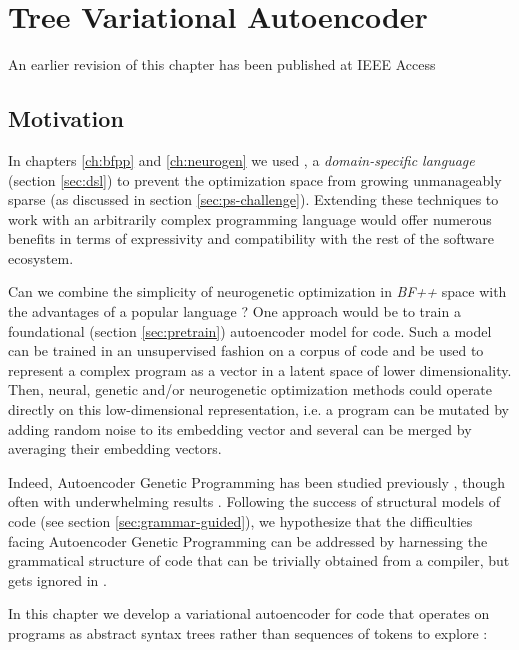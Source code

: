 \chapter{Tree Variational Autoencoder}\label{ch:tree2tree}
\begin{remark}
    An earlier revision of this chapter \cite{liventsevTreeVariationalAutoencoder2025} has been published at IEEE Access
\end{remark}

\section{Motivation}

In chapters \ref{ch:bfpp} and \ref{ch:neurogen} we used , a \emph{domain-specific language} (section \ref{sec:dsl}) to prevent the optimization space from growing unmanageably sparse (as discussed in section \ref{sec:ps-challenge}).
Extending these techniques to work with an arbitrarily complex programming language would offer numerous benefits in terms of expressivity and compatibility with the rest of the software ecosystem.

Can we combine the simplicity of neurogenetic optimization in \emph{BF++} space with the advantages of a popular language \cite{tiobe2017tiobe}?
One approach would be to train a foundational (section \ref{sec:pretrain}) autoencoder \cite{autoencoders} model for code.
Such a model can be trained in an unsupervised fashion on a corpus of code and be used to represent a complex program as a vector in a latent space of lower dimensionality.
Then, neural, genetic and/or neurogenetic optimization methods could operate directly on this low-dimensional representation, i.e. a program can be mutated by adding random noise to its embedding vector and several can be merged by averaging their embedding vectors.

Indeed, Autoencoder Genetic Programming has been studied previously \cite{wittenbergDenoisingAutoencoderGenetic2023,latentspaceopt}, though often with underwhelming results \cite{autoenc-gp}.
Following the success of structural models of code (see section \ref{sec:grammar-guided}), we hypothesize that the difficulties facing Autoencoder Genetic Programming can be addressed by harnessing the grammatical structure of code that can be trivially obtained from a compiler, but gets ignored in \cite{wittenbergDenoisingAutoencoderGenetic2023,latentspaceopt,autoenc-gp}.

In this chapter we develop a variational autoencoder for code that operates on programs as abstract syntax trees rather than sequences of tokens to explore \rqtree{}:

